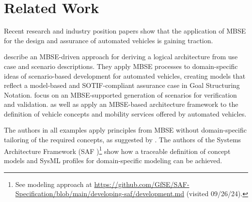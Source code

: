 \section{Related Work}
\label{sec:related-work}
\vspace{-0.5em}
Recent research \parencite{meyer2022, kinay2024, sahin2021, raulf2023} and industry position papers \parencite{siemensplmsoftware2018} show that the application of MBSE for the design and assurance of automated vehicles is gaining traction.

\textcite{meyer2022} describe an MBSE-driven approach for deriving a logical architecture from use case and scenario descriptions.
They apply MBSE processes to domain-specific ideas of scenario-based development for automated vehicles, creating models that reflect a model-based and SOTIF-compliant assurance case in Goal Structuring Notation.
\textcite{kinay2024} focus on an MBSE-supported generation of scenarios for verification and validation.
\textcite{raulf2023} as well as \textcite{sahin2021} apply an MBSE-based architecture framework to the definition of vehicle concepts and mobility services offered by automated vehicles.

The authors in all examples apply principles from MBSE without domain-specific tailoring of the required concepts, as suggested by \textcite{blott2023}. 
The authors of the Systems Architecture Framework (SAF \parencite{leute2021})\footnote{See modeling approach at \url{https://github.com/GfSE/SAF-Specification/blob/main/developing-saf/development.md} (visited 09/26/24).} show how a traceable definition of concept models and SysML profiles for domain-specific modeling can be achieved.